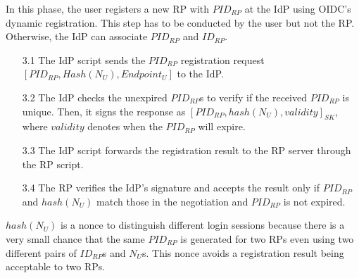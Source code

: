 In this phase, the user registers a new RP with $PID_{RP}$ at the IdP using OIDC's dynamic registration. This step has to be conducted by the user but not the RP. Otherwise, the IdP can associate $PID_{RP}$ and $ID_{RP}$.
\vspace{-\topsep}
\begin{itemize}
\item[3.1] The IdP script sends the $PID_{RP}$ registration request $[PID_{RP}, Hash( N_U), Endpoint_U]$ to the IdP.
\vspace{-\topsep}
\item[3.2] The IdP checks the unexpired $PID_{RP}$s to verify if the received $PID_{RP}$ is unique. Then, it signs the response as $[PID_{RP}, hash( N_U), validity]_{SK}$, where $validity$ denotes when the $PID_{RP}$ will expire.
\vspace{-\topsep}
\item[3.3] The IdP script forwards the registration result to the RP server through the RP script.
\vspace{-\topsep}
\item[3.4] The RP verifies the IdP's signature and accepts the result only if $PID_{RP}$ and $hash(N_U)$ match those in the negotiation and $PID_{RP}$ is not expired.
\end{itemize}
\vspace{-\topsep}
$hash(N_U)$ is a nonce to distinguish different login sessions because there is a very small chance that the same $PID_{RP}$ is generated for two RPs even using two different pairs of $ID_{RP}$s and $N_U$s. This nonce avoids a registration result being acceptable to two RPs.

